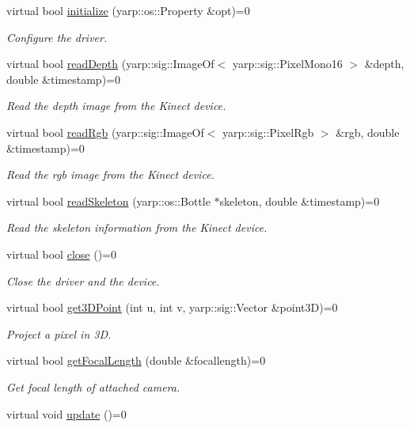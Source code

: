 \begin{DoxyCompactItemize}
\item 
virtual bool \hyperlink{classkinectWrapper_1_1KinectDriver_a4ac34031bd32525a6e3df7e2aa3389e4}{initialize} (yarp\+::os\+::\+Property \&opt)=0
\begin{DoxyCompactList}\small\item\em Configure the driver. \end{DoxyCompactList}\item 
virtual bool \hyperlink{classkinectWrapper_1_1KinectDriver_ac8ecdcb66bce7478113be5bbfdcdc540}{read\+Depth} (yarp\+::sig\+::\+Image\+Of$<$ yarp\+::sig\+::\+Pixel\+Mono16 $>$ \&depth, double \&timestamp)=0
\begin{DoxyCompactList}\small\item\em Read the depth image from the Kinect device. \end{DoxyCompactList}\item 
virtual bool \hyperlink{classkinectWrapper_1_1KinectDriver_a75851d95e5095f28ab1d2f84bb83e8c8}{read\+Rgb} (yarp\+::sig\+::\+Image\+Of$<$ yarp\+::sig\+::\+Pixel\+Rgb $>$ \&rgb, double \&timestamp)=0
\begin{DoxyCompactList}\small\item\em Read the rgb image from the Kinect device. \end{DoxyCompactList}\item 
virtual bool \hyperlink{classkinectWrapper_1_1KinectDriver_a4438aefe634466a180b7e7ffafa4267a}{read\+Skeleton} (yarp\+::os\+::\+Bottle $\ast$skeleton, double \&timestamp)=0
\begin{DoxyCompactList}\small\item\em Read the skeleton information from the Kinect device. \end{DoxyCompactList}\item 
virtual bool \hyperlink{classkinectWrapper_1_1KinectDriver_a1735a23505e5dfbf84ec77fda9c082ba}{close} ()=0
\begin{DoxyCompactList}\small\item\em Close the driver and the device. \end{DoxyCompactList}\item 
virtual bool \hyperlink{classkinectWrapper_1_1KinectDriver_abaf6f40b416f3fc27dec1ea284d3ee5a}{get3\+D\+Point} (int u, int v, yarp\+::sig\+::\+Vector \&point3\+D)=0
\begin{DoxyCompactList}\small\item\em Project a pixel in 3\+D. \end{DoxyCompactList}\item 
virtual bool \hyperlink{classkinectWrapper_1_1KinectDriver_a6091c144c7d80622d9f16df4267e6370}{get\+Focal\+Length} (double \&focallength)=0
\begin{DoxyCompactList}\small\item\em Get focal length of attached camera. \end{DoxyCompactList}\item 
virtual void \hyperlink{classkinectWrapper_1_1KinectDriver_acf56a6ba90b6e827390228d313ae1f7a}{update} ()=0\label{classkinectWrapper_1_1KinectDriver_acf56a6ba90b6e827390228d313ae1f7a}


\end{DoxyCompactItemize}
